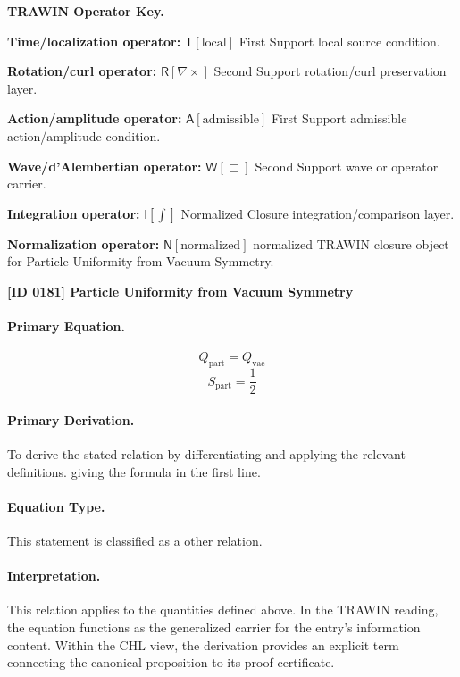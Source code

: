 \par\vspace{0.45\baselineskip}
\noindent\begin{minipage}[t]{\linewidth}
\begingroup
\small
\raggedright
\textbf{TRAWIN Operator Key.}\par
\noindent\textbf{Time/localization operator:} $\mathsf{T}\!\left[\mathrm{local}\right]$ First Support local source condition.\par
\noindent\textbf{Rotation/curl operator:} $\mathsf{R}\!\left[\nabla\times\right]$ Second Support rotation/curl preservation layer.\par
\noindent\textbf{Action/amplitude operator:} $\mathsf{A}\!\left[\mathrm{admissible}\right]$ First Support admissible action/amplitude condition.\par
\noindent\textbf{Wave/d'Alembertian operator:} $\mathsf{W}\!\left[\Box\right]$ Second Support wave or operator carrier.\par
\noindent\textbf{Integration operator:} $\mathsf{I}\!\left[\int\right]$ Normalized Closure integration/comparison layer.\par
\noindent\textbf{Normalization operator:} $\mathsf{N}\!\left[\mathrm{normalized}\right]$ normalized TRAWIN closure object for Particle Uniformity from Vacuum Symmetry.\par
\endgroup
\end{minipage}

\clearpage
\noindent\textbf{[ID 0181] Particle Uniformity from Vacuum Symmetry}\par
\vspace{0.35em}
\paragraph{Primary Equation.}
\[
Q_{\mathrm{part}} = Q_{\mathrm{vac}}
\]
\[
S_{\mathrm{part}} = \frac{1}{2}
\]

\paragraph{Primary Derivation.}
To derive the stated relation by differentiating and applying the relevant definitions. giving the formula in the first line.
\paragraph{Equation Type.}
This statement is classified as a other relation.

\paragraph{Interpretation.}
This relation applies to the quantities defined above. In the TRAWIN reading, the equation functions as the generalized carrier for the entry’s information content. Within the CHL view, the derivation provides an explicit term connecting the canonical proposition to its proof certificate.

